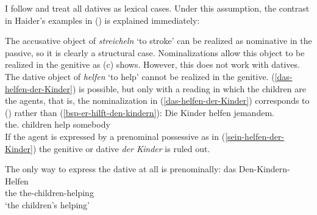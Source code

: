 I follow \citet{Haider86} and treat all datives as lexical cases. Under this assumption, the
contrast in Haider's examples \citeyearpar[]{Haider86} in () is explained immediately:
\eal
{}

\label{das-helfen-der-Kinder}
\label{sein-helfen-der-Kinder}
\zl
The accusative object of \emph{streicheln} `to stroke' can be realized as nominative in the passive,
so it is clearly a structural case. Nominalizations allow this object to be realized in the genitive
as (c) shows. However, this does not work with datives. The dative object of \emph{helfen}
`to help' cannot be realized in the genitive. (\ref{das-helfen-der-Kinder}) is possible, but only
with a reading in which the children are the agents, that is, the nominalization in
(\ref{das-helfen-der-Kinder}) corresponds to () rather than (\ref{bsp-er-hilft-den-kindern}):
\ea
\gll Die Kinder helfen jemandem.\\
     the.\NOM{} children help somebody\\
\z
If the agent is expressed by a prenominal possessive as in (\ref{sein-helfen-der-Kinder}) the
genitive or dative \emph{der Kinder} is ruled out.

The only way to express the dative at all is prenominally:
\ea
\gll das Den-Kindern-Helfen\\
     the the-children-helping\\
\glt `the children's helping'
\z

